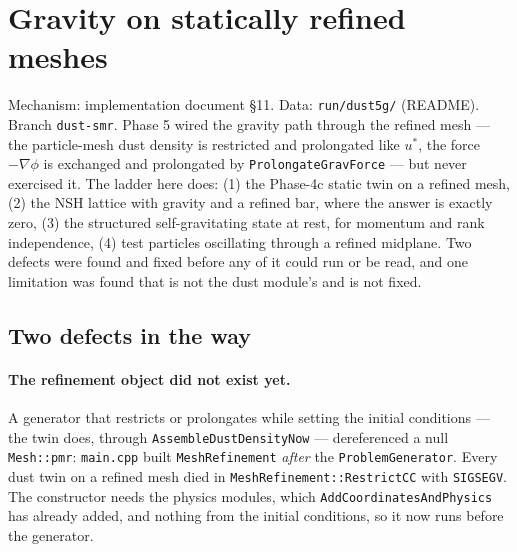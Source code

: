 \documentclass[11pt]{article}
\newcommand{\code}[1]{\texttt{#1}}
\newcommand{\file}[1]{\texttt{#1}}
\begin{document}
\section{Gravity on statically refined meshes}
\label{sec:gravsmr}

Mechanism: implementation document \S11. Data: \file{run/dust5g/} (README). Branch
\code{dust-smr}. Phase 5 wired the gravity path through the refined mesh --- the
particle-mesh dust density is restricted and prolongated like $u^*$, the force
$-\nabla\phi$ is exchanged and prolongated by \code{ProlongateGravForce} --- but never
exercised it. The ladder here does: (1) the Phase-4c static twin on a refined mesh, (2)
the NSH lattice with gravity and a refined bar, where the answer is exactly zero, (3) the
structured self-gravitating state at rest, for momentum and rank independence, (4) test
particles oscillating through a refined midplane. Two defects were found and fixed
before any of it could run or be read, and one limitation was found that is not the dust
module's and is not fixed.

\subsection{Two defects in the way}

\paragraph{The refinement object did not exist yet.} A generator that restricts or
prolongates while setting the initial conditions --- the twin does, through
\code{AssembleDustDensityNow} --- dereferenced a null \code{Mesh::pmr}: \file{main.cpp}
built \code{MeshRefinement} \emph{after} the \code{ProblemGenerator}. Every dust twin on
a refined mesh died in \code{MeshRefinement::RestrictCC} with \code{SIGSEGV}. The
constructor needs the physics modules, which \code{AddCoordinatesAndPhysics} has already
added, and nothing from the initial conditions, so it now runs before the generator.
\end{document}
